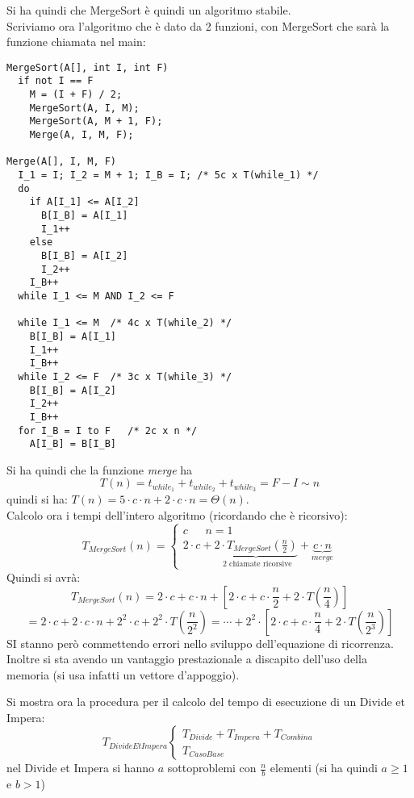 \documentclass[a4paper,12pt,oneside,tikz]{book}
\begin{document}
\newpage
Si ha quindi che MergeSort è quindi un algoritmo stabile.\\
Scriviamo ora l'algoritmo che è dato da 2 funzioni, con MergeSort che sarà la funzione chiamata nel main:
\begin{verbatim}
MergeSort(A[], int I, int F)
  if not I == F
    M = (I + F) / 2;
    MergeSort(A, I, M);
    MergeSort(A, M + 1, F);
    Merge(A, I, M, F);
    
Merge(A[], I, M, F)
  I_1 = I; I_2 = M + 1; I_B = I; /* 5c x T(while_1) */
  do
    if A[I_1] <= A[I_2]
      B[I_B] = A[I_1]
      I_1++
    else
      B[I_B] = A[I_2]
      I_2++
    I_B++
  while I_1 <= M AND I_2 <= F
  
  while I_1 <= M  /* 4c x T(while_2) */
    B[I_B] = A[I_1]
    I_1++
    I_B++
  while I_2 <= F  /* 3c x T(while_3) */
    B[I_B] = A[I_2]
    I_2++
    I_B++
  for I_B = I to F   /* 2c x n */
    A[I_B] = B[I_B]
\end{verbatim}
Si ha quindi che la funzione \textit{merge} ha $$T(n)=t_{while_1}+t_{while_2}+t_{while_3}=F-I\sim n$$ quindi si ha: $T(n)=5\cdot c\cdot n+2\cdot c\cdot n=\Theta(n)$.\\
Calcolo ora i tempi dell'intero algoritmo (ricordando che è ricorsivo):
$$T_{MergeSort}(n)=\begin{cases}
		c \,\,\,\,\,\,\,\,\ n=1 \\
		2\cdot c+\underbrace{2\cdot T_{MergeSort}\left(\frac{n}{2}\right)}_{\mbox{ 2 chiamate ricorsive}}+\underbrace{c\cdot n }_{merge}
	\end{cases}$$
Quindi si avrà:
$$T_{MergeSort}(n)=2\cdot c+ c\cdot n+\left[2\cdot c+c\cdot \frac{n}{2}+2\cdot T\left(\frac{n}{4}\right)\right]$$
$$=2\cdot c+2\cdot c\cdot n+2^2\cdot c+2^2\cdot T\left(\frac{n}{2^2}\right)=\cdots+2^2\cdot\left[ 2\cdot c+c\cdot \frac{n}{4}+2\cdot T\left(\frac{n}{2^3}\right)\right] $$
SI stanno però commettendo errori nello sviluppo dell'equazione di ricorrenza. Inoltre si sta avendo un vantaggio prestazionale a discapito dell'uso della memoria (si usa infatti un vettore d'appoggio).
\begin{shaded}
	\begin{nota}
		Si mostra ora la procedura per il calcolo del tempo di esecuzione di un Divide et Impera:
		$$T_{DivideEtImpera}\begin{cases}
				T_{Divide}+T_{Impera}+T_{Combina} \\
				T_{CasoBase}
			\end{cases}$$
		nel Divide et Impera si hanno $a$ sottoproblemi con $\frac{n}{b}$ elementi (si ha quindi $a\geq 1$ e $b>1$)
	\end{nota}
\end{shaded}
\end{document}
